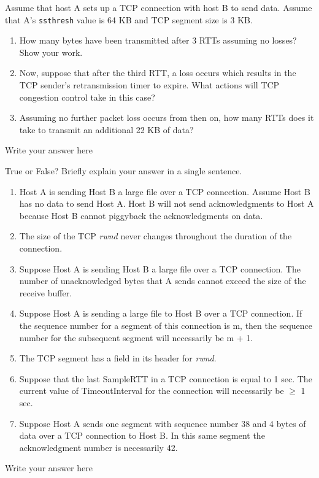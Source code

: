 \documentclass{report}
\begin{document}
\begin{problem}
Assume that host A sets up a TCP connection with host B to send data. Assume that A's \texttt{ssthresh} value is 64 KB and TCP segment size is 3 KB.
\begin{enumerate}
	\item How many bytes have been transmitted after 3 RTTs assuming no losses? Show your work.
	\item Now, suppose that after the third RTT, a loss occurs which results in the TCP sender's retransmission timer to expire. What actions will TCP congestion control take in this case?
	\item Assuming no further packet loss occurs from then on, how many RTTs does it take to transmit an additional 22 KB of data?
\end{enumerate}


\begin{answer}{35em}
  Write your answer here
\end{answer}

\end{problem}


\newpage



\begin{problem}
True or False? Briefly explain your answer in a single sentence.

\begin{enumerate}
    \item Host A is sending Host B a large file over a TCP connection. Assume Host B has no data to send Host A. Host B will not send acknowledgments to Host A because Host B cannot piggyback the acknowledgments on data.
    \item  The size of the TCP \textit{rwnd} never changes throughout the duration of the connection.
    \item  Suppose Host A is sending Host B a large file over a TCP connection. The number of unacknowledged bytes that A sends cannot exceed the size of the receive buffer.
    \item  Suppose Host A is sending a large file to Host B over a TCP connection. If the sequence number for a segment of this connection is m, then the sequence number for the subsequent segment will necessarily be m + 1.
    \item  The TCP segment has a field in its header for \textit{rwnd}.
    \item  Suppose that the last SampleRTT in a TCP connection is equal to 1 sec. The current value of TimeoutInterval for the connection will necessarily be $\geq$ 1 sec.
    \item  Suppose Host A sends one segment with sequence number 38 and 4 bytes of data over a TCP connection to Host B. In this same segment the acknowledgment number is necessarily 42.
\end{enumerate}


\begin{answer}{35em}
  Write your answer here
\end{answer}

\end{problem}
\end{document}

